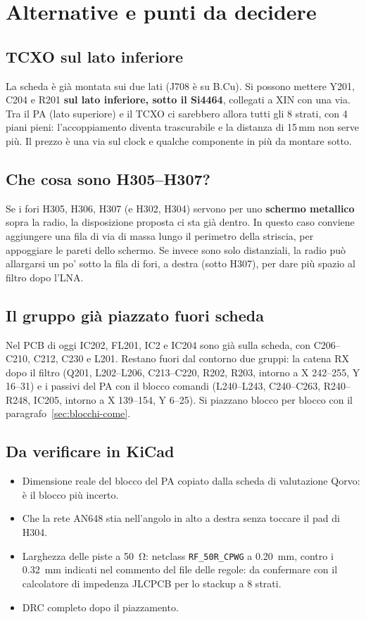 \documentclass[a4paper,11pt]{article}
\begin{document}
\section{Alternative e punti da decidere}
\label{sec:alternative}
\subsection{TCXO sul lato inferiore}
La scheda è già montata sui due lati (J708 è su B.Cu). Si possono mettere Y201, C204 e R201 \textbf{sul lato inferiore, sotto il Si4464}, collegati a XIN con una via. Tra il PA (lato superiore) e il TCXO ci sarebbero allora tutti gli 8 strati, con 4 piani pieni: l'accoppiamento diventa trascurabile e la distanza di 15\,mm non serve più. Il prezzo è una via sul clock e qualche componente in più da montare sotto.

\subsection{Che cosa sono H305--H307?}
Se i fori H305, H306, H307 (e H302, H304) servono per uno \textbf{schermo metallico} sopra la radio, la disposizione proposta ci sta già dentro. In questo caso conviene aggiungere una fila di via di massa lungo il perimetro della striscia, per appoggiare le pareti dello schermo. Se invece sono solo distanziali, la radio può allargarsi un po' sotto la fila di fori, a destra (sotto H307), per dare più spazio al filtro dopo l'LNA.

\subsection{Il gruppo già piazzato fuori scheda}
Nel PCB di oggi IC202, FL201, IC2 e IC204 sono già sulla scheda, con C206--C210, C212, C230 e L201. Restano fuori dal contorno due gruppi: la catena RX dopo il filtro (Q201, L202--L206, C213--C220, R202, R203, intorno a X 242--255, Y 16--31) e i passivi del PA con il blocco comandi (L240--L243, C240--C263, R240--R248, IC205, intorno a X 139--154, Y 6--25). Si piazzano blocco per blocco con il paragrafo~\ref{sec:blocchi-come}.

\subsection{Da verificare in KiCad}
\begin{itemize}
\item Dimensione reale del blocco del PA copiato dalla scheda di valutazione Qorvo: è il blocco più incerto.
\item Che la rete AN648 stia nell'angolo in alto a destra senza toccare il pad di H304.
\item Larghezza delle piste a \SI{50}{\ohm}: netclass \texttt{RF\_50R\_CPWG} a \SI{0.20}{mm}, contro i \SI{0.32}{mm} indicati nel commento del file delle regole: da confermare con il calcolatore di impedenza JLCPCB per lo stackup a 8 strati.
\item DRC completo dopo il piazzamento.
\end{itemize}
\end{document}
